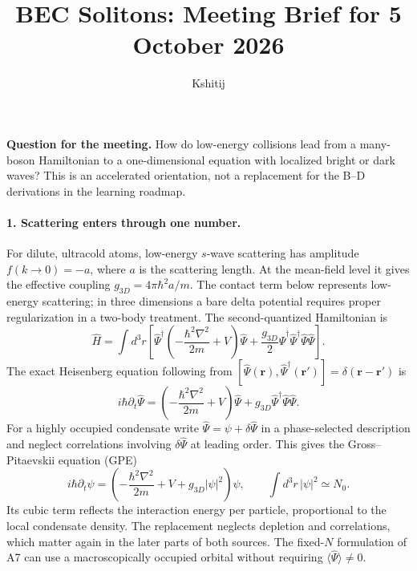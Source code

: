 \documentclass[11pt,a4paper]{article}
\title{BEC Solitons: Meeting Brief for 5 October 2026}
\author{Kshitij}
\date{}
\begin{document}
\maketitle

\noindent\textbf{Question for the meeting.} How do low-energy collisions lead from a many-boson Hamiltonian to a one-dimensional equation with localized bright or dark waves? This is an accelerated orientation, not a replacement for the B--D derivations in the learning roadmap.

\paragraph{1. Scattering enters through one number.}
For dilute, ultracold atoms, low-energy $s$-wave scattering has amplitude $f(k\to0)=-a$, where $a$ is the scattering length. At the mean-field level it gives the effective coupling $g_{3D}=4\pi\hbar^2a/m$. The contact term below represents low-energy scattering; in three dimensions a bare delta potential requires proper regularization in a two-body treatment. The second-quantized Hamiltonian is
\[
\hat H=\int d^3r\left[\hat\Psi^\dagger\left(-\frac{\hbar^2\nabla^2}{2m}+V\right)\hat\Psi
+\frac{g_{3D}}2\hat\Psi^\dagger\hat\Psi^\dagger\hat\Psi\hat\Psi\right].
\]
The exact Heisenberg equation following from $[\hat\Psi(\mathbf r),\hat\Psi^\dagger(\mathbf r')]=\delta(\mathbf r-\mathbf r')$ is
\[
i\hbar\partial_t\hat\Psi=\left(-\frac{\hbar^2\nabla^2}{2m}+V\right)\hat\Psi
+g_{3D}\hat\Psi^\dagger\hat\Psi\hat\Psi.
\]
For a highly occupied condensate write $\hat\Psi=\psi+\delta\hat\Psi$ in a phase-selected description and neglect correlations involving $\delta\hat\Psi$ at leading order. This gives the Gross--Pitaevskii equation (GPE)
\[
\boxed{i\hbar\partial_t\psi=\left(-\frac{\hbar^2\nabla^2}{2m}+V+g_{3D}|\psi|^2\right)\psi},
\qquad \int d^3r\,|\psi|^2\simeq N_0.
\]
Its cubic term reflects the interaction energy per particle, proportional to the local condensate density. The replacement neglects depletion and correlations, which matter again in the later parts of both sources. The fixed-$N$ formulation of A7 can use a macroscopically occupied orbital without requiring $\langle\hat\Psi\rangle\ne0$.
\end{document}
